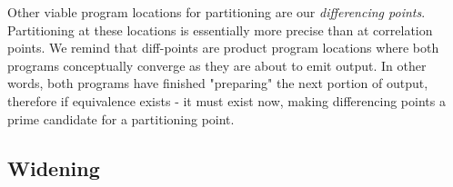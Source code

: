 Other viable program locations for partitioning are our \emph{differencing points}. Partitioning at these locations is essentially more precise than at correlation points. We remind that diff-points are product program locations where both programs conceptually converge as they are about to emit output. In other words, both programs have finished "preparing" the next portion of output, therefore if equivalence exists - it must exist now, making differencing points a prime candidate for a partitioning point.




\subsection{Widening}

